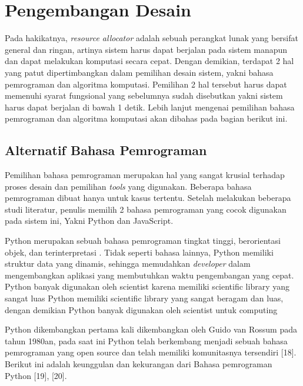 \section{Pengembangan Desain}
    Pada hakikatnya, \textit{resource allocator} adalah sebuah perangkat lunak yang bersifat general dan ringan, artinya sistem harus dapat berjalan pada sistem manapun
    dan dapat melakukan komputasi secara cepat. Dengan demikian, terdapat 2 hal yang patut dipertimbangkan dalam pemilihan desain sistem, yakni bahasa pemrograman dan algoritma komputasi.
    Pemilihan 2 hal tersebut harus dapat memenuhi syarat fungsional yang sebelumnya sudah disebutkan yakni sistem harus dapat berjalan di bawah 1 detik.
    Lebih lanjut mengenai pemilihan bahasa pemrograman dan algoritma komputasi akan dibahas pada bagian berikut ini.
    \subsection{Alternatif Bahasa Pemrograman}
        Pemilihan bahasa pemrograman merupakan hal yang sangat krusial terhadap proses desain dan pemilihan \textit{tools} yang digunakan. 
        Beberapa bahasa pemrograman dibuat hanya untuk kasus tertentu. Setelah melakukan beberapa studi literatur, penulis memilih 2 bahasa pemrograman
        yang cocok digunakan pada sistem ini, Yakni Python dan JavaScript.

        Python merupakan sebuah bahasa pemrograman tingkat tinggi, berorientasi objek, dan
        terinterpretasi \citep{python}. Tidak seperti bahasa lainnya, Python memiliki struktur data yang dinamis,
        sehingga memudahkan \textit{developer} dalam mengembangkan aplikasi yang membutuhkan waktu
        pengembangan yang cepat. Python banyak digunakan oleh scientist karena memiliki scientific library yang sangat luas
        Python memiliki scientific library yang sangat beragam dan luas, dengan demikian Python banyak digunakan oleh scientist untuk computing
        
        Python dikembangkan pertama kali dikembangkan oleh Guido van
        Rossum pada tahun 1980an, pada saat ini Python telah berkembang menjadi sebuah bahasa
        pemrograman yang open source dan telah memiliki komunitasnya tersendiri [18]. Berikut ini
        adalah keunggulan dan kekurangan dari Bahasa pemrograman Python [19], [20].

